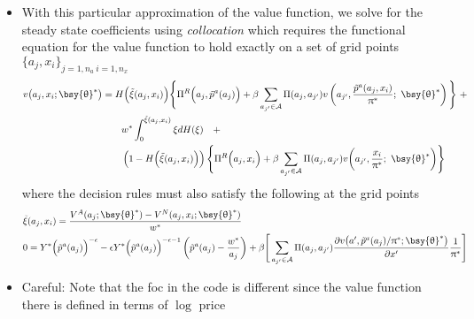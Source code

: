 \documentclass[a4paper,10pt]{article}  %
\begin{document}
\begin{itemize}[leftmargin=0in,label=\raisebox{0.50ex}{\tiny$\bullet$}]
   \item With this particular approximation of the value function, we solve for the steady state coefficients using \emph{collocation}
   which requires the functional equation for the value function to hold exactly on a set of grid points 
   $ \big\{a_j, x_i\big\}_{j=1,n_a \ i =1,n_x} $
   \begin{align*}
      v \big( a_j, x_i; \bsy{\uptheta}^* \big) & = 
      H \Big( \tilde{\xi}(a_j,x_i) \Big) 
         \Bigg\{ 
               \Pi^R\Big( a_j, \tilde{p}^a (a_j) \Big) + \beta\sum_{a_{j'}\in \mathcal{A} } \Pi(a_j,a_{j'})
               v \left( a_{j'},\frac{\tilde{p}^a (a_j, x_i)}{\uppi^*} ; \ \bsy{\uptheta}^* \right) 
         \Bigg\} \  + \\
      & \qquad w^* \int_0^{ \tilde{\xi}(a_j,x_i) } \xi dH(\xi) \quad + \\
      & \qquad \left( 1- H\Big( \tilde{\xi}(a_j,x_i) \Big) \right) 
         \Bigg\{
               \Pi^R\Big( a_j, x_i \Big) + \beta\sum_{a_{j'}\in \mathcal{A} } \Pi(a_j,a_{j'})
               v \bigg( a_{j'},\frac{x_i}{\uppi^*} ; \ \bsy{\uptheta}^* \bigg) 
         \Bigg\}
   \end{align*}
   where the decision rules must also satisfy the following at the grid points
   \small \begin{align}
      \label{eq:policies_eq1}
      & \tilde{\xi}(a_j, x_i) = \frac{ V^A(a_j; \bsy{\uptheta}^*) - V^N(a_j, x_i ; \bsy{\uptheta}^*) }{ w^* } \\
      \label{eq:policies_eq2} 
      & 0 = Y^* \Big( \tilde{p}^a( a_j ) \Big)^{-\epsilon}   - 
         \epsilon Y^* \Big( \tilde{p}^a( a_j ) \Big)^{-\epsilon-1} \left( \tilde{p}^a( a_j ) - \frac{ w^* }{a_j} \right) +
         \beta 
         \Bigg[ 
               \sum_{a_{j'}\in \mathcal{A} } \Pi(a_j,a_{j'}) 
               \frac{ \partial v \big( a', \tilde{p}^a( a_j )/\uppi^* ; \bsy{\uptheta}^*\big) }{ \partial x' } \frac{1}{\uppi^*}
         \Bigg]
   \end{align} \normalsize

   \item {\sc \color{RubineRed} Careful:} Note that the foc in the code is different since the value function there is defined in terms
   of $ \log $ price
\end{itemize}
\end{document}
